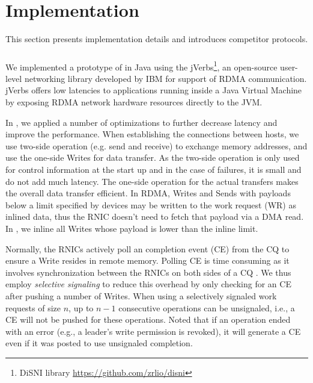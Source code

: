\section{Implementation}
\label{sec:implementation}

This section presents implementation details and introduces competitor protocols.

\subsubsection*{\libname}

We implemented a prototype of \libname in Java using the jVerbs\footnote{DiSNI
library \url{https://github.com/zrlio/disni}}\cite{stuedi2013jverbs}, an
open-source user-level networking library developed by IBM for support of RDMA
communication. jVerbs offers low latencies to applications running inside a Java
Virtual Machine by exposing RDMA network hardware resources directly to the JVM.

In \libname, we applied a number of optimizations to further decrease latency
and improve the performance. When establishing the connections between hosts, we
use two-side operation (e.g. send and receive) to exchange memory addresses, and
use the one-side Writes for data transfer. As the two-side operation is only
used for control information at the start up and in the case of failures, it is
small and do not add much latency. The one-side operation for the actual
transfers makes the overall data transfer efficient. In RDMA, Writes and Sends
with payloads below a limit specified by devices may be written to the work
request (WR) as inlined data, thus the RNIC doesn't need to fetch that payload
via a DMA read. In \libname, we inline all Writes whose payload is lower than
the inline limit. 

Normally, the RNICs actively poll an completion event (CE) from the CQ to ensure
a Write resides in remote memory. Polling CE is time consuming as it involves
synchronization between the RNICs on both sides of a CQ \cite{APUS}. We thus
employ \emph{selective signaling} \cite{Kalia2014} to reduce this overhead by
only checking for an CE after pushing a number of Writes. When using a
selectively signaled work requests of size $n$, up to $n-1$ consecutive
operations can be unsignaled, i.e., a CE will not be pushed for these
operations. Noted that if an operation ended with an error (e.g., a leader's
write permission is revoked), it will generate a CE even if it was posted to use
unsignaled completion.

